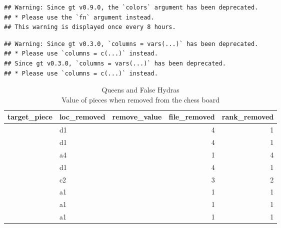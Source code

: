 \documentclass[
]{article}
\begin{document}
\begin{verbatim}
## Warning: Since gt v0.9.0, the `colors` argument has been deprecated.
## * Please use the `fn` argument instead.
## This warning is displayed once every 8 hours.
\end{verbatim}

\begin{verbatim}
## Warning: Since gt v0.3.0, `columns = vars(...)` has been deprecated.
## * Please use `columns = c(...)` instead.
## Since gt v0.3.0, `columns = vars(...)` has been deprecated.
## * Please use `columns = c(...)` instead.
\end{verbatim}

\begin{table}[!t]
\caption*{
{\large Queens and False Hydras} \\ 
{\small Value of pieces when removed from the chess board}
} 
\fontsize{12.0pt}{14.4pt}\selectfont
\begin{tabular*}{\linewidth}{@{\extracolsep{\fill}}llrrr}
\toprule
target\_piece & loc\_removed & remove\_value & file\_removed & rank\_removed \\ 
\midrule\addlinespace[2.5pt]
{\cellcolor[HTML]{0000FF}{\textcolor[HTML]{FFFFFF}{Q}}} & {d1} & {\cellcolor[HTML]{8888FF}{\textcolor[HTML]{FFFFFF}{1322}}} & {4} & {1} \\ 
{\cellcolor[HTML]{0000FF}{\textcolor[HTML]{FFFFFF}{Q}}} & {d1} & {\cellcolor[HTML]{8889FF}{\textcolor[HTML]{FFFFFF}{1316}}} & {4} & {1} \\ 
{\cellcolor[HTML]{0000FF}{\textcolor[HTML]{FFFFFF}{Q}}} & {a4} & {\cellcolor[HTML]{858DFF}{\textcolor[HTML]{FFFFFF}{1263}}} & {1} & {4} \\ 
{\cellcolor[HTML]{0000FF}{\textcolor[HTML]{FFFFFF}{Q}}} & {d1} & {\cellcolor[HTML]{7E96FF}{\textcolor[HTML]{FFFFFF}{1154}}} & {4} & {1} \\ 
{\cellcolor[HTML]{0000FF}{\textcolor[HTML]{FFFFFF}{Q}}} & {c2} & {\cellcolor[HTML]{5DB5FF}{\textcolor[HTML]{000000}{769}}} & {3} & {2} \\ 
{\cellcolor[HTML]{FF00FF}{\textcolor[HTML]{FFFFFF}{R}}} & {a1} & {\cellcolor[HTML]{54BBFF}{\textcolor[HTML]{000000}{691}}} & {1} & {1} \\ 
{\cellcolor[HTML]{FF00FF}{\textcolor[HTML]{FFFFFF}{R}}} & {a1} & {\cellcolor[HTML]{51BCFF}{\textcolor[HTML]{000000}{671}}} & {1} & {1} \\ 
{\cellcolor[HTML]{FF00FF}{\textcolor[HTML]{FFFFFF}{R}}} & {a1} & {\cellcolor[HTML]{50BCFF}{\textcolor[HTML]{000000}{668}}} & {1} & {1} \\ 

\end{tabular*}
\end{table}
\end{document}
